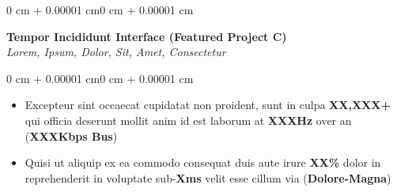 \documentclass[10pt, letterpaper]{article}
\newenvironment{onecolentry}{
\begin{adjustwidth}{0 cm + 0.00001 cm}{0 cm + 0.00001 cm}
    }{
\end{adjustwidth}
}
\begin{document}
    \vspace{0.03 cm}
    \begin{onecolentry}
        \hspace*{0.1cm} \textbf{Tempor Incididunt Interface (Featured Project C)} \\
        \hspace*{0.1cm} \textit{Lorem, Ipsum, Dolor, Sit, Amet, Consectetur}
    \end{onecolentry}
    \vspace{0.02 cm}
    \begin{onecolentry}
        \begin{itemize}[leftmargin=0.4cm + 10pt, labelsep=5pt]
            \item Excepteur sint occaecat cupidatat non proident, sunt in culpa \textbf{XX,XXX+} qui officia deserunt mollit anim id est laborum at \textbf{XXXHz} over an (\textbf{XXXKbps Bus})
            \item Quisi ut aliquip ex ea commodo consequat duis aute irure \textbf{XX\%} dolor in reprehenderit in voluptate sub-\textbf{Xms} velit esse cillum via (\textbf{Dolore-Magna})
        \end{itemize}
    \end{onecolentry}
\end{document}

